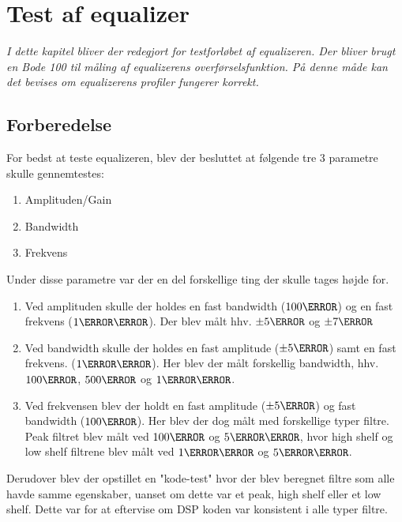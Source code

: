 \chapter{Test af equalizer}\label{sec:test_eq}


\emph{I dette kapitel bliver der redegjort for testforløbet af equalizeren. Der bliver brugt en Bode 100 til måling af equalizerens overførselsfunktion. På denne måde kan det bevises om equalizerens profiler fungerer korrekt.}

\section{Forberedelse}


For bedst at teste equalizeren, blev der besluttet at følgende tre 3 parametre skulle gennemtestes: 

\begin{enumerate}
    \item Amplituden/Gain
    \item Bandwidth
    \item Frekvens \\
\end{enumerate}



Under disse parametre var der en del forskellige ting der skulle tages højde for. 
\begin{enumerate}
    \item Ved amplituden skulle der holdes en fast bandwidth ($100\hertz$) og en fast frekvens ($1\kilo\hertz$). Der blev målt hhv. $\pm5\decibel$ og $\pm7\decibel$
    \item Ved bandwidth skulle der holdes en fast amplitude ($\pm5\decibel$) samt en fast frekvens. ($1\kilo\hertz$). Her blev der målt forskellig bandwidth, hhv. $100\hertz$, $500\hertz$ og $1\kilo\hertz$.
    \item Ved frekvensen blev der holdt en fast amplitude ($\pm5\decibel$) og fast bandwidth ($100\hertz$). Her blev der dog målt med forskellige typer filtre. Peak filtret blev målt ved $100\hertz$ og $5\kilo\hertz$, hvor high shelf og low shelf filtrene blev målt ved $1\kilo\hertz$ og $5\kilo\hertz$. \\
\end{enumerate}

Derudover blev der opstillet en "kode-test" hvor der blev beregnet filtre som alle havde samme egenskaber, uanset om dette var et peak, high shelf eller et low shelf. Dette var for at eftervise om DSP koden var konsistent i alle typer filtre. 

